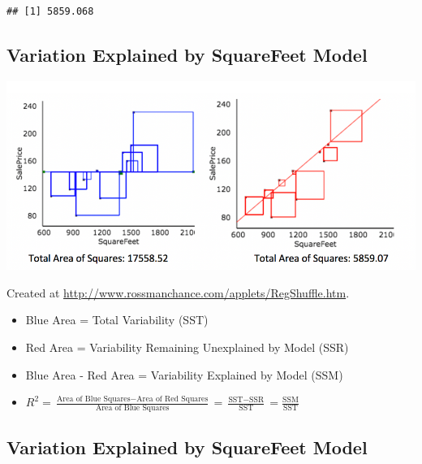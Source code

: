 \documentclass[]{book}
\newenvironment{Shaded}{\begin{snugshade}}{\end{snugshade}}
\newcommand{\KeywordTok}[1]{\textcolor[rgb]{0.13,0.29,0.53}{\textbf{#1}}}
\newcommand{\DecValTok}[1]{\textcolor[rgb]{0.00,0.00,0.81}{#1}}
\newcommand{\OperatorTok}[1]{\textcolor[rgb]{0.81,0.36,0.00}{\textbf{#1}}}
\newcommand{\NormalTok}[1]{#1}
\begin{document}
\begin{Shaded}
\end{Shaded}

\begin{verbatim}
## [1] 5859.068
\end{verbatim}

\subsection{Variation Explained by SquareFeet
Model}\label{variation-explained-by-squarefeet-model}

\includegraphics[width=0.65\linewidth]{Rsq}

Created at \url{http://www.rossmanchance.com/applets/RegShuffle.htm}.

\begin{itemize}
\item
  Blue Area = Total Variability (SST)
\item
  Red Area = Variability Remaining Unexplained by Model (SSR)
\item
  Blue Area - Red Area = Variability Explained by Model (SSM)
\item
  \(R^2 = \frac{\text{Area of Blue Squares} - \text{Area of Red Squares}}{\text{Area of Blue Squares}} = \frac{\text{SST}-\text{SSR}}{\text{SST}}= \frac{\text{SSM}}{\text{SST}}\)
\end{itemize}

\subsection{Variation Explained by SquareFeet
Model}\label{variation-explained-by-squarefeet-model-1}
\end{document}
